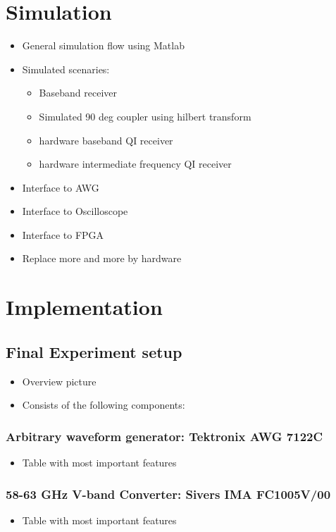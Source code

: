 \chapter{Simulation}
\begin{itemize}
\item General simulation flow using Matlab
\item Simulated scenaries:
  \begin{itemize}
  \item Baseband receiver
  \item Simulated 90 deg coupler using hilbert transform
  \item hardware baseband QI receiver
  \item hardware intermediate frequency QI receiver
  \end{itemize}
\item Interface to AWG
\item Interface to Oscilloscope
\item Interface to FPGA
\item Replace more and more by hardware
\end{itemize}

\chapter{Implementation}
\section{Final Experiment setup}
\begin{itemize}
\item Overview picture
\item Consists of the following components:
\end{itemize}

\subsection{Arbitrary waveform generator: Tektronix AWG 7122C}
\begin{itemize}
\item Table with most important features
\end{itemize}

\subsection{58-63 GHz V-band Converter: Sivers IMA FC1005V/00}
\begin{itemize}
\item Table with most important features
\end{itemize}

